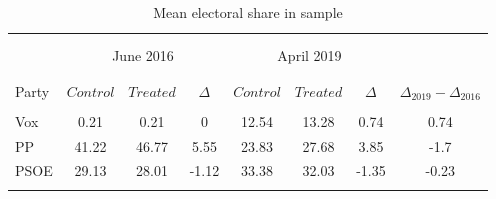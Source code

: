 \begin{table}[!htbp] \centering
\caption{Mean electoral share in sample}
\label{tab:did_deco}
\small
\begin{tabular}{lccccccc}
\\[-1.8ex]\hline
\hline \\[-1.8ex]
\\[-1.8ex]
& \multicolumn{3}{c}{June 2016} & \multicolumn{3}{c}{April 2019} & \\\\[-1.8ex]
\cline{2-7}\\[-1.8ex]
Party & $Control$ & $Treated$ & $\Delta$ & $Control$ & $Treated$ & $\Delta$ & $\Delta_{2019} - \Delta_{2016}$ \\
\hline \\[-1.8ex]
Vox & 0.21 & 0.21 & 0 & 12.54 & 13.28 & 0.74 & 0.74 \\
PP & 41.22 & 46.77 & 5.55 & 23.83 & 27.68 & 3.85 & -1.7 \\
PSOE & 29.13 & 28.01 & -1.12 & 33.38 & 32.03 & -1.35 & -0.23 \\
\hline
\hline \\[-1.8ex]
\end{tabular}
\end{table}

